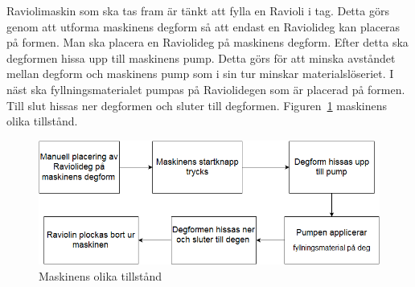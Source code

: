 Raviolimaskin som ska tas fram är tänkt att fylla en Ravioli i tag. Detta görs genom att utforma maskinens degform så att endast en Raviolideg kan placeras på formen. Man ska placera en Raviolideg på maskinens degform. Efter detta ska degformen hissa upp till maskinens pump. Detta görs för att minska avståndet mellan degform och maskinens pump som i sin tur minskar materialslöseriet. I näst ska fyllningsmaterialet pumpas på Raviolidegen som är placerad på formen. Till slut hissas ner degformen och sluter till degformen. Figuren~\ref{blockschema} maskinens olika tillstånd.

\begin{figure}[ht]
	\begin{center}
		\includegraphics[scale=0.8]{images/blockschema.png}
		\caption{Maskinens olika tillstånd}
		\label{blockschema}	
	\end{center}
\end{figure}
